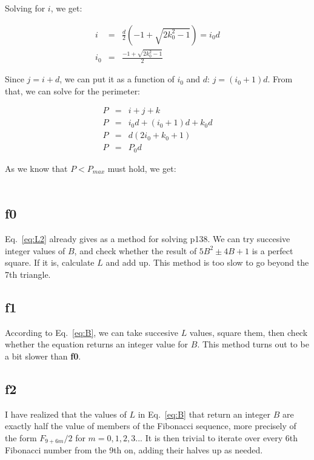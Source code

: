 \documentclass[english]{article}
\begin{document}
Solving for $i$, we get:

\begin{eqnarray}
i & = & \frac{d}{2}(-1 + \sqrt{2k_0^2 - 1}) = i_0 d \\
i_0 & = & \frac{-1 + \sqrt{2k_0^2 - 1}}{2}
\end{eqnarray}

Since $j = i + d$, we can put it as a function of $i_0$ and $d$: $j = (i_0 + 1) d$. From that, we can solve for the perimeter:

\begin{eqnarray}
P & = & i + j + k \\
P & = & i_0 d + (i_0+1)d + k_0 d \\
P & = & d (2 i_0 + k_0 +1) \\
P & = & P_0 d
\end{eqnarray}

As we know that $P < P_{max}$ must hold, we get:

\begin{eqnarray}
\end{eqnarray}

\subsection{f0}

Eq.~\ref{eq:L2} already gives as a method for solving p138. We can try succesive integer values of $B$, and check whether the result of $5B^2\pm 4B+1$ is a perfect square. If it is, calculate $L$ and add up. This method is too slow to go beyond the 7th triangle.

\subsection{f1}

According to Eq.~\ref{eq:B}, we can take succesive $L$ values, square them, then check whether the equation returns an integer value for $B$. This method turns out to be a bit slower than {\bf f0}.

\subsection{f2}

I have realized that the values of $L$ in Eq.~\ref{eq:B} that return an integer $B$ are exactly half the value of members of the Fibonacci sequence, more precisely of the form $F_{9+6m}/2$ for $m = 0, 1, 2, 3...$ It is then trivial to iterate over every 6th Fibonacci number from the 9th on, adding their halves up as needed.
\end{document}
